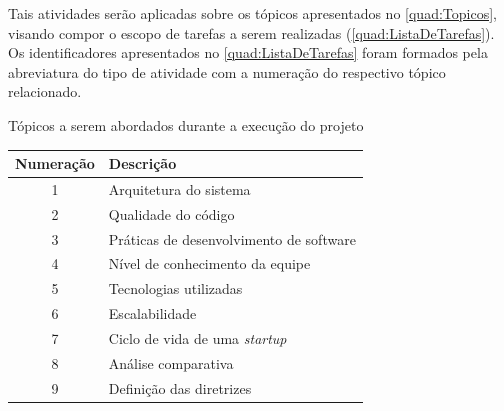 Tais atividades serão aplicadas sobre os tópicos apresentados no \autoref{quad:Topicos},
visando compor o escopo de tarefas a serem realizadas (\autoref{quad:ListaDeTarefas}).
Os identificadores apresentados no \autoref{quad:ListaDeTarefas} foram formados pela
abreviatura do tipo de atividade com a numeração do respectivo tópico relacionado.

\begin{quadro}
    \caption{Tópicos a serem abordados durante a execução do projeto\label{quad:Topicos}}
    \begin{tabular}{ | c | l | }
    \hline
    \textbf{Numeração} &
        \textbf{Descrição} \\ \hline
        1 & Arquitetura do sistema \\ \hline
        2 & Qualidade do código \\ \hline
        3 & Práticas de desenvolvimento de software \\ \hline
        4 & Nível de conhecimento da equipe \\ \hline
        5 & Tecnologias utilizadas \\ \hline
        6 & Escalabilidade \\ \hline
        7 & Ciclo de vida de uma \textit{startup} \\ \hline
        8 & Análise comparativa \\ \hline
        9 & Definição das diretrizes \\ \hline
    \end{tabular}
\end{quadro}


